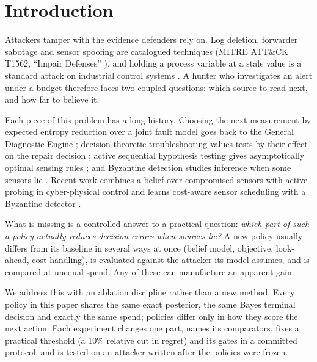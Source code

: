 \documentclass[conference]{IEEEtran}
\begin{document}
\section{Introduction}

Attackers tamper with the evidence defenders rely on. Log deletion, forwarder sabotage and sensor spoofing are
catalogued techniques (MITRE ATT\&CK T1562, ``Impair Defenses'' \cite{attackt1562}), and holding a process variable at a
stale value is a standard attack on industrial control systems \cite{shin2020hai,urbina2016}. A hunter who investigates
an alert under a budget therefore faces two coupled questions: which source to read next, and how far to believe it.

Each piece of this problem has a long history. Choosing the next measurement by expected entropy reduction over a
joint fault model goes back to the General Diagnostic Engine \cite{dekleer1987}; decision-theoretic troubleshooting
values tests by their effect on the repair decision \cite{heckerman1995}; active sequential hypothesis testing gives
asymptotically optimal sensing rules \cite{naghshvar2013}; and Byzantine detection studies inference when some sensors
lie \cite{marano2009,soltanmohammadi2012,li2021byz}. Recent work combines a belief over compromised sensors with active
probing in cyber-physical control \cite{andersson2026} and learns cost-aware sensor scheduling with a Byzantine
detector \cite{zhong2025}.

What is missing is a controlled answer to a practical question: \emph{which part of such a policy actually reduces
decision errors when sources lie?} A new policy usually differs from its baseline in several ways at once (belief model,
objective, look-ahead, cost handling), is evaluated against the attacker its model assumes, and is compared at unequal
spend. Any of these can manufacture an apparent gain.

We address this with an ablation discipline rather than a new method. Every policy in this paper shares the same exact
posterior, the same Bayes terminal decision and exactly the same spend; policies differ only in how they score the next
action. Each experiment changes one part, names its comparators, fixes a practical threshold (a 10\% relative cut in
regret) and its gates in a committed protocol, and is tested on an attacker written after the policies were frozen.
\end{document}

